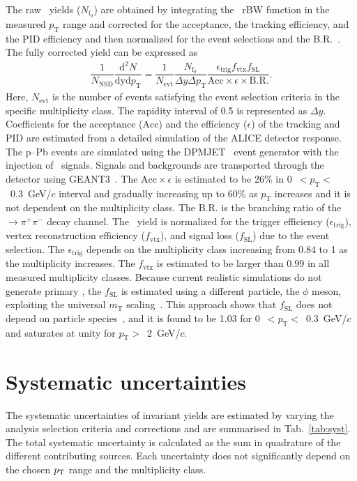 The raw \fzero~yields ($N_{\mathrm{f}_{0}}$) are obtained by integrating the \fzero~rBW function in the measured $p_{\mathrm{T}}$ range and corrected for the acceptance, the tracking efficiency, and the PID efficiency and then normalized for the event selections and the B.R.~\cite{Stone:2013eaa}. The fully corrected yield can be expressed as
\begin{eqnarray}
\dfrac{1}{N_{\mathrm{NSD}}}\dfrac{\mathrm{d}^{2}N}{\mathrm{dyd}p_{\mathrm{T}}} = \dfrac{1}{N_{\mathrm{evt}}} \dfrac{ N_{\mathrm{f}_{0}} }{ \Delta y \Delta p_{\mathrm{T}} } \dfrac{  \epsilon_{\mathrm{trig}} f_{\mathrm{vtx}} f_{\mathrm{SL}} }{\mathrm{Acc} \times \epsilon \times \mathrm{B.R.} }.
\end{eqnarray}
Here, $N_{\mathrm{evt}}$ is the number of events satisfying the event selection criteria in the specific multiplicity class. The rapidity interval of 0.5 is represented as $\Delta y$. Coefficients for the acceptance ($\mathrm{Acc}$) and the efficiency ($\epsilon$) of the tracking and PID are estimated from a detailed simulation of the ALICE detector response. The p--Pb events are simulated using the DPMJET~\cite{Fedynitch:2015kcn} event generator with the injection of \fzero~signals. Signals and backgrounds are transported through the detector using GEANT3~\cite{Brun:1994aa}. The $\mathrm{Acc}\times\epsilon$ is estimated to be 26\% in 0~$<p_{\mathrm{T}}<$~0.3~GeV/$c$ interval and gradually increasing up to 60\% as $p_{\mathrm{T}}$ increases and it is not dependent on the multiplicity class. The $\mathrm{B.R.}$ is the branching ratio of the \fzero~$\rightarrow \pi^{+}\pi^{-}$ decay channel. The \fzero~yield is normalized for the trigger efficiency ($\epsilon_{\mathrm{trig}}$), vertex reconstruction efficiency ($f_{\mathrm{vtx}}$), and signal loss ($f_{\mathrm{SL}}$) due to the event selection. The $\epsilon_{\mathrm{trig}}$ depends on the multiplicity class increasing from 0.84 to 1 as the multiplicity increases. The $f_{\mathrm{vtx}}$ is estimated to be larger than 0.99 in all measured multiplicity classes. Because current realistic simulations do not generate primary \fzero, the $f_{\mathrm{SL}}$ is estimated using a different particle, the $\phi$ meson, exploiting the universal $m_{\mathrm{T}}$ scaling~\cite{Altenkamper:2017qot}. This approach shows that $f_{\mathrm{SL}}$ does not depend on particle species~\cite{ALICE:2019xyr}, and it is found to be 1.03 for 0~$<p_{\mathrm{T}}<$~0.3~GeV/$c$ and saturates at unity for $p_{\mathrm{T}}>$~2~GeV/$c$.

\section{Systematic uncertainties}
\label{sec:syst}
The systematic uncertainties of invariant yields are estimated by varying the analysis selection criteria and corrections and are summarised in Tab.~\ref{tab:syst}. The total systematic uncertainty is calculated as the sum in quadrature of the different contributing sources. Each uncertainty does not significantly depend on the chosen $p_{\rm{T}}$ range and the multiplicity class.

